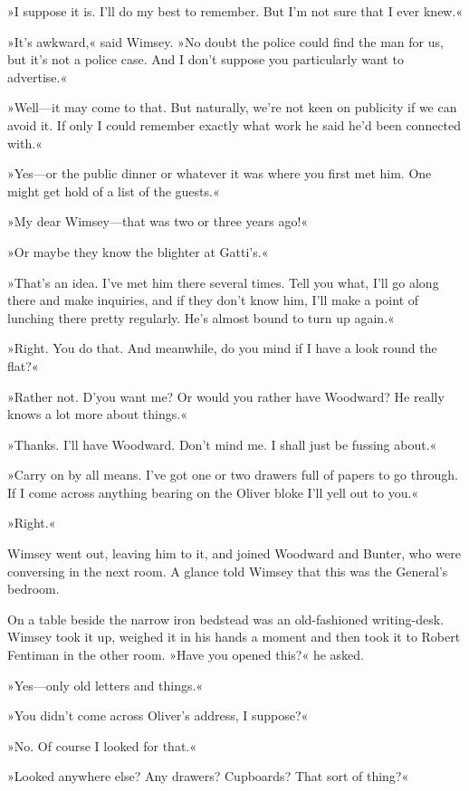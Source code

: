 »I suppose it is. I'll do my best to remember. But I'm not sure that I ever knew.«

»It's awkward,« said Wimsey. »No doubt the police could find the man for us, but it's not a police case. And I don't suppose you particularly want to advertise.«

»Well\allowbreak---\allowbreak it may come to that. But naturally, we're not keen on publicity if we can avoid it. If only I could remember exactly what work he said he'd been connected with.«

»Yes\allowbreak---\allowbreak or the public dinner or whatever it was where you first met him. One might get hold of a list of the guests.«

»My dear Wimsey\allowbreak---\allowbreak that was two or three years ago!«

»Or maybe they know the blighter at Gatti's.«

»That's an idea. I've met him there several times. Tell you what, I'll go along there and make inquiries, and if they don't know him, I'll make a point of lunching there pretty regularly. He's almost bound to turn up again.«

»Right. You do that. And meanwhile, do you mind if I have a look round the flat?«

»Rather not. D'you want me? Or would you rather have Woodward? He really knows a lot more about things.«

»Thanks. I'll have Woodward. Don't mind me. I shall just be fussing about.«

»Carry on by all means. I've got one or two drawers full of papers to go through. If I come across anything bearing on the Oliver bloke I'll yell out to you.«

»Right.«

Wimsey went out, leaving him to it, and joined Woodward and Bunter, who were conversing in the next room. A glance told Wimsey that this was the General's bedroom.

On a table beside the narrow iron bedstead was an old-fashioned writing-desk. Wimsey took it up, weighed it in his hands a moment and then took it to Robert Fentiman in the other room. »Have you opened this?« he asked.

»Yes\allowbreak---\allowbreak only old letters and things.«

»You didn't come across Oliver's address, I suppose?«

»No. Of course I looked for that.«

»Looked anywhere else? Any drawers? Cupboards? That sort of thing?«


